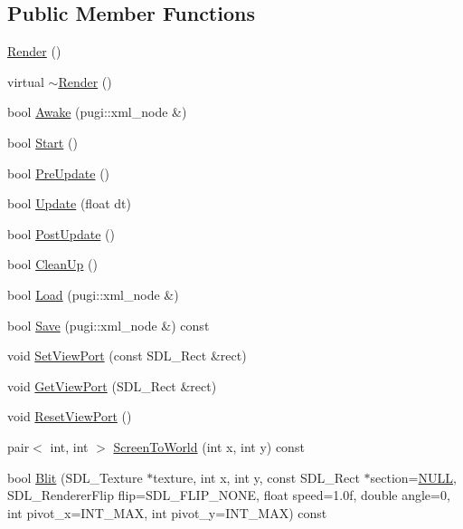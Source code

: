 \subsection*{Public Member Functions}
\begin{DoxyCompactItemize}
\item 
\mbox{\hyperlink{class_render_a8610cc11739ef679b5935dd819021351}{Render}} ()
\item 
virtual \mbox{\hyperlink{class_render_ab0f4b917605cb15902f8d045a4197faf}{$\sim$\+Render}} ()
\item 
bool \mbox{\hyperlink{class_render_a8a61f512aafe184f4d322433e5f695a4}{Awake}} (pugi\+::xml\+\_\+node \&)
\item 
bool \mbox{\hyperlink{class_render_afe6d22551e6d5bbcc55cdd20ab23afde}{Start}} ()
\item 
bool \mbox{\hyperlink{class_render_a96d1311a9bc190d2a1dd669bb3c56ab4}{Pre\+Update}} ()
\item 
bool \mbox{\hyperlink{class_render_a7172f5776000ed7c973a26e35536f2d6}{Update}} (float dt)
\item 
bool \mbox{\hyperlink{class_render_a87fd5693f0ece06ba67ab57534b65dc6}{Post\+Update}} ()
\item 
bool \mbox{\hyperlink{class_render_a96a6770025fabf47750ef73600b3d58e}{Clean\+Up}} ()
\item 
bool \mbox{\hyperlink{class_render_a47a72b2f12ff4a24eb4bf98d9b617434}{Load}} (pugi\+::xml\+\_\+node \&)
\item 
bool \mbox{\hyperlink{class_render_a8a7339d22cc1019c02dd4778f4f36593}{Save}} (pugi\+::xml\+\_\+node \&) const
\item 
void \mbox{\hyperlink{class_render_a228efb937133be5bbc677bfc98ddb406}{Set\+View\+Port}} (const S\+D\+L\+\_\+\+Rect \&rect)
\item 
void \mbox{\hyperlink{class_render_a3ebd83e75f2168779adb605ff25aff37}{Get\+View\+Port}} (S\+D\+L\+\_\+\+Rect \&rect)
\item 
void \mbox{\hyperlink{class_render_a7bba546f8cb8ecc2b29b9d57f99fb121}{Reset\+View\+Port}} ()
\item 
pair$<$ int, int $>$ \mbox{\hyperlink{class_render_a4ff43172da50d9d5f706b432dca80900}{Screen\+To\+World}} (int x, int y) const
\item 
bool \mbox{\hyperlink{class_render_acc05d0aa22b4bcb2dcedf5e435dbb430}{Blit}} (S\+D\+L\+\_\+\+Texture $\ast$texture, int x, int y, const S\+D\+L\+\_\+\+Rect $\ast$section=\mbox{\hyperlink{_defs_8h_a070d2ce7b6bb7e5c05602aa8c308d0c4}{N\+U\+LL}}, S\+D\+L\+\_\+\+Renderer\+Flip flip=S\+D\+L\+\_\+\+F\+L\+I\+P\+\_\+\+N\+O\+NE, float speed=1.\+0f, double angle=0, int pivot\+\_\+x=\+I\+N\+T\+\_\+\+M\+A\+X, int pivot\+\_\+y=\+I\+N\+T\+\_\+\+M\+A\+X) const

\end{DoxyCompactItemize}
